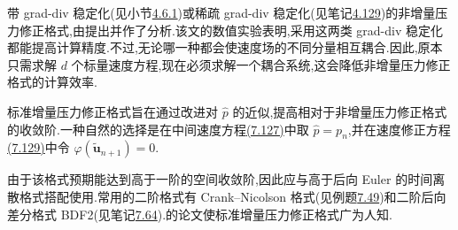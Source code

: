 \begin{note}\label{note:nonincremental-grad-div-stabilization}
带 grad-div 稳定化(见小节\hyperref[sec:stokes-grad-div-stabilization]{4.6.1})或稀疏 grad-div 稳定化(见笔记\hyperref[note:stokes-grad-div-implementation]{4.129})的非增量压力修正格式,由\textcite{BowersLeBorneRebholz2014}提出并作了分析.该文的数值实验表明,采用这两类 grad-div 稳定化都能提高计算精度.不过,无论哪一种都会使速度场的不同分量相互耦合.因此,原本只需求解 $d$ 个标量速度方程,现在必须求解一个耦合系统,这会降低非增量压力修正格式的计算效率.
\end{note}

\begin{note}[标准增量压力修正格式]\label{note:standard-incremental-pressure-correction}
标准增量压力修正格式旨在通过改进对 $\widehat p$ 的近似,提高相对于非增量压力修正格式的收敛阶.一种自然的选择是在中间速度方程\hyperref[eq:projection-intermediate-velocity]{(7.127)}中取 $\widehat p=p_n$,并在速度修正方程\hyperref[eq:projection-correction-step]{(7.129)}中令 $\varphi(\widetilde{\bm{u}}_{n+1})=0$.

由于该格式预期能达到高于一阶的空间收敛阶,因此应与高于后向 Euler 的时间离散格式搭配使用.常用的二阶格式有 Crank--Nicolson 格式(见例题\hyperref[ex:time-dependent-crank-nicolson]{7.49})和二阶后向差分格式 BDF2(见笔记\hyperref[note:bdf2-scheme]{7.64}).\textcite{vanKan1986}的论文使标准增量压力修正格式广为人知.
\end{note}


